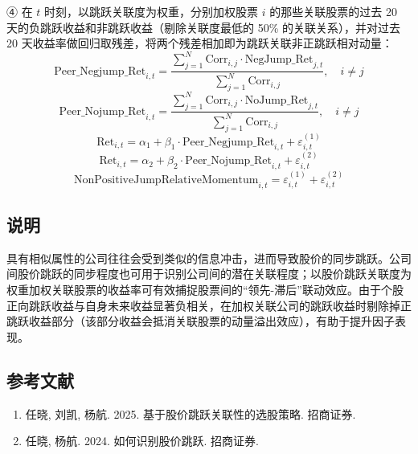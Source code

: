 \documentclass{article}
\begin{document}
④ 在 \( t \) 时刻，以跳跃关联度为权重，分别加权股票 \( i \) 的那些关联股票的过去 20 天的负跳跃收益和非跳跃收益（剔除关联度最低的 50\% 的关联关系），并对过去 20 天收益率做回归取残差，将两个残差相加即为跳跃关联非正跳跃相对动量：
\begin{equation}
    \mathrm{Peer\_Negjump\_Ret}_{i,t} = \frac{\sum_{j=1}^{N} \mathrm{Corr}_{i,j} \cdot \mathrm{NegJump\_Ret}_{j,t}}{\sum_{j=1}^{N} \mathrm{Corr}_{i,j}}, \quad i \neq j
\end{equation}
\begin{equation}
    \mathrm{Peer\_Nojump\_Ret}_{i,t} = \frac{\sum_{j=1}^{N} \mathrm{Corr}_{i,j} \cdot \mathrm{NoJump\_Ret}_{j,t}}{\sum_{j=1}^{N} \mathrm{Corr}_{i,j}}, \quad i \neq j
\end{equation}
\begin{equation}
    \mathrm{Ret}_{i,t} = \alpha_1 + \beta_1 \cdot \mathrm{Peer\_Negjump\_Ret}_{i,t} + \varepsilon_{i,t}^{(1)}
\end{equation}
\begin{equation}
    \mathrm{Ret}_{i,t} = \alpha_2 + \beta_2 \cdot \mathrm{Peer\_Nojump\_Ret}_{i,t} + \varepsilon_{i,t}^{(2)}
\end{equation}
\begin{equation}
    \mathrm{NonPositiveJumpRelativeMomentum}_{i,t} = \varepsilon_{i,t}^{(1)} + \varepsilon_{i,t}^{(2)}
\end{equation}

\subsection{说明}
具有相似属性的公司往往会受到类似的信息冲击，进而导致股价的同步跳跃。公司间股价跳跃的同步程度也可用于识别公司间的潜在关联程度；以股价跳跃关联度为权重加权关联股票的收益率可有效捕捉股票间的“领先-滞后”联动效应。由于个股正向跳跃收益与自身未来收益显著负相关，在加权关联公司的跳跃收益时剔除掉正跳跃收益部分（该部分收益会抵消关联股票的动量溢出效应），有助于提升因子表现。

\subsection{参考文献}
\begin{enumerate}
    \item 任晓, 刘凯, 杨航. 2025. 基于股价跳跃关联性的选股策略. 招商证券.
    \item 任晓, 杨航. 2024. 如何识别股价跳跃. 招商证券.
\end{enumerate}
\end{document}

